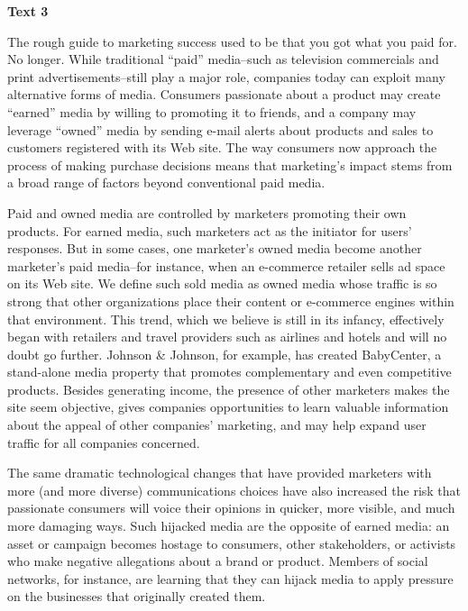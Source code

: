
\begin{center}\textbf{Text 3}\end{center}

\qquad The rough guide to marketing success used to be that you got what you paid for. No longer. While traditional ``paid'' media--such as television commercials and print advertisements--still play a major role, companies today can exploit many alternative forms of media. Consumers passionate about a product may create ``earned'' media by willing to promoting it to friends, and a company may leverage ``owned'' media by sending e-mail alerts about products and sales to customers registered with its Web site. The way consumers now approach the process of making purchase decisions means that marketing's impact stems from a broad range of factors beyond conventional paid media.

\qquad Paid and owned media are controlled by marketers promoting their own products. For earned media, such marketers act as the initiator for users' responses. But in some cases, one marketer's owned media become another marketer's paid media--for instance, when an e-commerce retailer sells ad space on its Web site. We define such sold media as owned media whose traffic is so strong that other organizations place their content or e-commerce engines within that environment. This trend, which we believe is still in its infancy, effectively began with retailers and travel providers such as airlines and hotels and will no doubt go further. Johnson \& Johnson, for example, has created BabyCenter, a stand-alone media property that promotes complementary and even competitive products. Besides generating income, the presence of other marketers makes the site seem objective, gives companies opportunities to learn valuable information about the appeal of other companies' marketing, and may help expand user traffic for all companies concerned. 

\qquad The same dramatic technological changes that have provided marketers with more (and more diverse) communications choices have also increased the risk that passionate consumers will voice their opinions in quicker, more visible, and much more damaging ways. Such hijacked media are the opposite of earned media: an asset or campaign becomes hostage to consumers, other stakeholders, or activists who make negative allegations about a brand or product. Members of social networks, for instance, are learning that they can hijack media to apply pressure on the businesses that originally created them.

